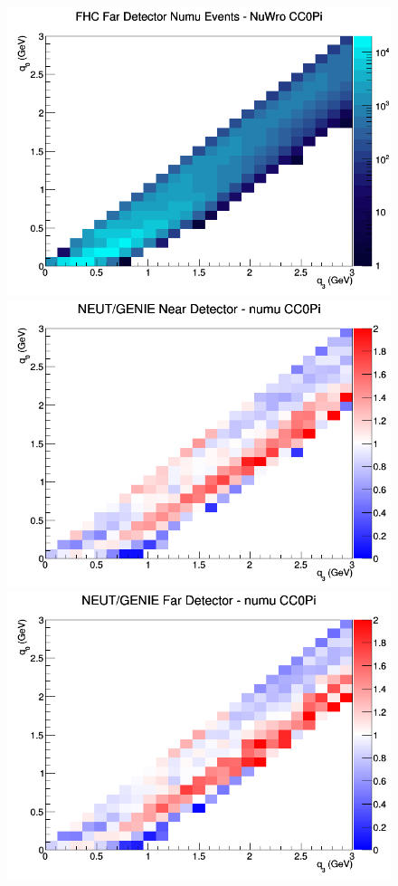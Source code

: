 \documentclass[12pt]{article}
\begin{document}
\begin{figure}[h]
\endminipage
{}
\includegraphics[width=\linewidth]{q0_q3/nominal/CC0Pi_FHC_FD_numu_q3_q0_NuWro.png}
\endminipage
\newline
{}
\includegraphics[width=\linewidth]{q0_q3/nominal/ratios/CC0Pi_NEUT_GENIE_numu_near_q3_q0.png}
\endminipage
{}
\includegraphics[width=\linewidth]{q0_q3/nominal/ratios/CC0Pi_NEUT_GENIE_numu_far_q3_q0.png}

\end{figure}
\end{document}
